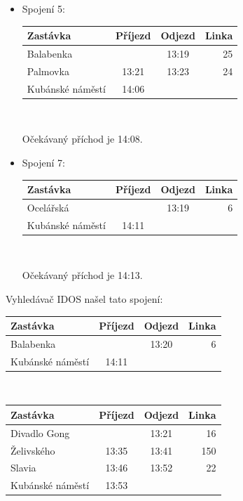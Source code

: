 \begin{itemize}
\item Spojení 5:\\
\vspace*{-0.5cm}
\begin{center}
\begin{tabular}{|l c c r|}\hline
{\bf Zastávka}&{\bf Příjezd}&{\bf Odjezd}&{\bf Linka}\\\hline
Balabenka&&13:19&25\\
Palmovka&13:21&13:23&24\\
Kubánské náměstí&14:06&&\\\hline
\end{tabular}\\[2mm]
\end{center}
Očekávaný příchod je 14:08.
 
\item Spojení 7:\\
\vspace*{-0.5cm}
\begin{center}
\begin{tabular}{|l c c r|}\hline
{\bf Zastávka}&{\bf Příjezd}&{\bf Odjezd}&{\bf Linka}\\\hline
Ocelářská&&13:19&6\\
Kubánské náměstí&14:11&&\\\hline
\end{tabular}\\[2mm]
\end{center}
Očekávaný příchod je 14:13. 
\end{itemize}

Vyhledávač IDOS našel tato spojení:\\
\vspace*{-0.5cm}
\begin{center}
\begin{tabular}{|l c c r|}\hline
{\bf Zastávka}&{\bf Příjezd}&{\bf Odjezd}&{\bf Linka}\\\hline
Balabenka&&13:20&6\\
Kubánské náměstí&14:11&&\\\hline
\end{tabular} \\[2mm]
\end{center}
\begin{center}
\begin{tabular}{|l c c r|}\hline
{\bf Zastávka}&{\bf Příjezd}&{\bf Odjezd}&{\bf Linka}\\\hline
Divadlo Gong&&13:21&16\\
Želivského&13:35&13:41&150\\
Slavia&13:46&13:52&22\\
Kubánské náměstí&13:53&&\\\hline
\end{tabular} 
\end{center}

